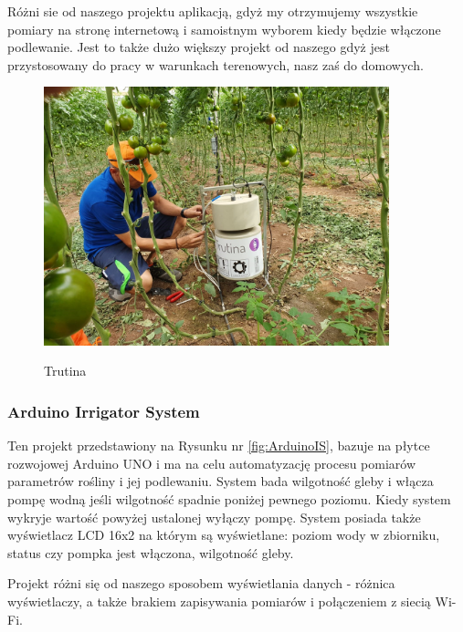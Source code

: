 \documentclass[12pt]{article}
\begin{document}
Różni sie od naszego projektu aplikacją, gdyż my otrzymujemy wszystkie pomiary na stronę internetową i samoistnym wyborem kiedy będzie włączone podlewanie. Jest to także dużo większy projekt od naszego gdyż jest przystosowany do pracy w warunkach terenowych, nasz zaś do domowych.



\begin{figure}[!h]
	\begin{center}
		{\includegraphics[width=10cm]{auto_water1.jpg}}
	\end{center}
	\caption{Trutina ~\cite{Trutina}}
	\label{fig:Trutina}
\end{figure}


\newpage
\subsubsection{Arduino Irrigator System }

Ten projekt przedstawiony na Rysunku nr \ref{fig:ArduinoIS}, bazuje na płytce rozwojowej Arduino UNO i ma na celu automatyzację procesu pomiarów parametrów rośliny i jej podlewaniu. System bada wilgotność gleby i włącza pompę wodną jeśli wilgotność spadnie poniżej pewnego poziomu. Kiedy system wykryje wartość powyżej ustalonej wyłączy pompę. System posiada także wyświetlacz LCD 16x2 na którym są wyświetlane: poziom wody w zbiorniku, status czy pompka jest włączona, wilgotność gleby.

Projekt różni się od naszego sposobem wyświetlania danych - różnica wyświetlaczy, a także brakiem zapisywania pomiarów i połączeniem z siecią Wi-Fi.
\end{document}
